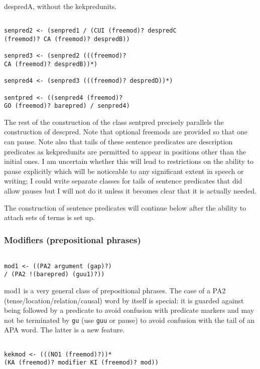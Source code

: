 \documentclass[12pt]{article}
\begin{document}
despredA, without the kekpredunits.

\begin{verbatim}

senpred2 <- (senpred1 / (CUI (freemod)? despredC 
(freemod)? CA (freemod)? despredB))

senpred3 <- (senpred2 (((freemod)? 
CA (freemod)? despredB))*)

senpred4 <- (senpred3 (((freemod)? despredD))*)

sentpred <- ((senpred4 (freemod)? 
GO (freemod)? barepred) / senpred4)

\end{verbatim}

The rest of the construction of the class sentpred precisely parallels the construction of descpred.  Note that
optional freemods are provided so that one can pause.  Note also that tails of these sentence predicates are description predicates
as kekpredunits are permitted to appear in positions other than the initial ones.  I am uncertain whether this will lead to restrictions on the ability to pause explicitly which will be noticeable to any significant extent in speech or writing; I could write separate classes for tails of sentence predicates that did allow pauses but I will not do it unless it becomes clear that it is actually needed.

The construction of sentence predicates will continue below after the ability to attach sets of terms is set up.

\subsubsection{Modifiers (prepositional phrases)}

\begin{verbatim}

mod1 <- ((PA2 argument (gap)?) 
/ (PA2 !(barepred) (guu1)?))

\end{verbatim}

mod1 is a very general class of prepositional phrases.  The case of a PA2 (tense/location/relation/causal) word
by itself is special:  it is guarded against being followed by a predicate to avoid confusion with predicate markers
and may not be terminated by {\tt gu} (use {\tt guu} or pause) to avoid confusion with the tail of an APA word.
The latter is a new feature.

\begin{verbatim}

kekmod <- (((NO1 (freemod)?))* 
(KA (freemod)? modifier KI (freemod)? mod))

\end{verbatim}
\end{document}
